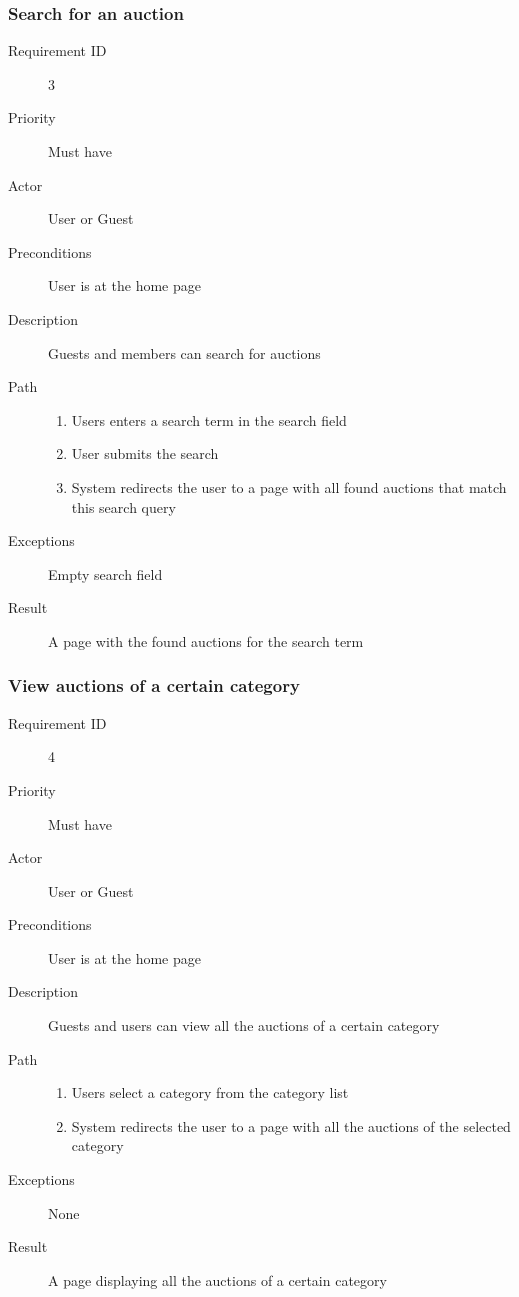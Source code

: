 		\subsubsection{Search for an auction}
			\begin{description}
				\item[Requirement ID] 3
				\item[Priority] Must have
				\item[Actor] User or Guest
				\item[Preconditions] User is at the home page
				\item[Description] Guests and members can search for auctions
				\item[Path]
 					\begin{enumerate}
						\item Users enters a search term in the search field
						\item User submits the search
						\item System redirects the user to a page with all found auctions that match this search
						query
					\end{enumerate}
				\item[Exceptions] Empty search field
				\item[Result] A page with the found auctions for the search term
			\end{description}
		\subsubsection{View auctions of a certain category}
			\begin{description}
				\item[Requirement ID] 4
				\item[Priority] Must have
				\item[Actor] User or Guest
				\item[Preconditions] User is at the home page
				\item[Description] Guests and users can view all the auctions of a certain category
				\item[Path]
 					\begin{enumerate}
						\item Users select a category from the category list
						\item System redirects the user to a page with all the auctions of the
							selected category
					\end{enumerate}
				\item[Exceptions] None
				\item[Result] A page displaying all the auctions of a certain category
			\end{description}
